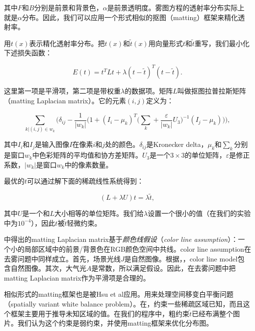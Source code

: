 \documentclass{ctexart}
\begin{document}
其中$F$和$B$分别是前景和背景色，$\alpha$是前景透明度。雾图方程的透射率分布实际上就是$\alpha$分布。因此，我们可以应用一个形式相似的抠图（matting）\cite{LevinLischinskiWeiss2006}框架来精化透射率。\par

用$t(x)$表示精化透射率分布。把$t(x)$和$\tilde{t}(x)$用向量形式$t$和$\tilde{t}$重写，我们最小化下述损失函数：

\begin{equation}\label{equ:15}
	E(t) = t^TLt + \lambda(t-\tilde{t})^T(t-\tilde{t}).
\end{equation}

这里第一项是平滑项，第二项是带权重$\lambda$的数据项。矩阵$L$叫做抠图拉普拉斯矩阵（matting Laplacian matrix）\cite{LevinLischinskiWeiss2006}。它的元素$(i, j)$定义为：

\begin{equation}\label{equ:16}
	\sum_{k | (i, j) \in w_k}\Big(
	\delta_{ij} - \frac{1}{|w_k|} \Big(
	1 + (I_i - \mu_k)^T \big(\sum_k + \frac{\varepsilon}{|w_k|}U_3\big)^{-1} (I_j - \mu_k)
	\Big)
	\Big),
\end{equation}

其中$I_i$和$I_j$是输入图像$I$在像素$i$和$j$处的颜色。$\delta_{ij}$是Kronecker delta，$\mu_k$和$\sum_k$分别是窗口$w_k$中色彩矩阵的平均值和协方差矩阵。$U_3$是一个$3 \times 3$的单位矩阵，$\varepsilon$是修正系数，$|w_k|$是窗口$w_k$中的像素数量。\par

最优的$t$可以通过解下面的稀疏线性系统得到：

\begin{equation}\label{equ:17}
	(L + \lambda U)t = \lambda \tilde{t},
\end{equation}

其中$U$是一个和$L$大小相等的单位矩阵。我们给$\lambda$设置一个很小的值（在我们的实验中为$10^{-4}$），因此$t$被$\tilde{t}$轻微约束。\par

\cite{LevinLischinskiWeiss2006}中得出的matting Laplacian matrix基于\emph{颜色线假设}（\emph{color line assumption}）：一个小的局部区域中的前景/背景色在RGB颜色空间中共线。color line assumption在去雾问题中同样成立。首先，场景光线$J$是自然图像。根据\cite{LevinLischinskiWeiss2006}，\cite{OmerWerman2004}，color line model包含自然图像。其次，大气光$A$是常数，所以满足假设。因此，在去雾问题中把matting Laplacian matrix作为平滑项是合理的。\par

相似形式的matting框架也是被Hsu et al应用。\cite{HsuMertensParisAvidanDurand2008}用来处理空间移变白平衡问题（spatially variant white balance problem）。在\cite{GilchristJacobsen1983}，\cite{OmerWerman2004}约束一些稀疏区域已知，而且这个框架主要用于推导未知区域的值。在我们的程序中，粗约束$\tilde{t}$已经布满整个图片。我们认为这个约束是弱约束，并使用matting框架来优化分布图。\par
\end{document}
